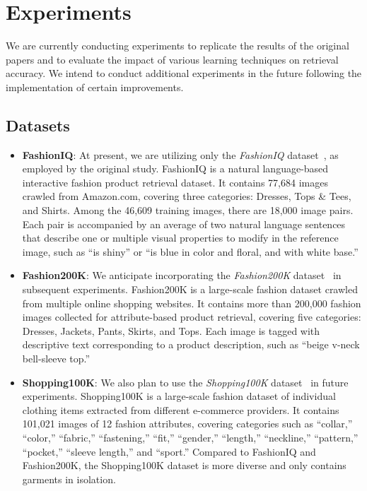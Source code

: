 \FloatBarrier
\section{Experiments}
We are currently conducting experiments to replicate the results of the original papers and to evaluate the impact of various learning techniques on retrieval accuracy. We intend to conduct additional experiments in the future following the implementation of certain improvements.

\subsection{Datasets}
\begin{itemize}
    \item \textbf{FashionIQ}: At present, we are utilizing only the \textit{FashionIQ} dataset~\cite{wu2020fashioniqnewdataset}, as employed by the original study. FashionIQ is a natural language-based interactive fashion product retrieval dataset. It contains 77,684 images crawled from Amazon.com, covering three categories: Dresses, Tops \& Tees, and Shirts. Among the 46,609 training images, there are 18,000 image pairs. Each pair is accompanied by an average of two natural language sentences that describe one or multiple visual properties to modify in the reference image, such as ``is shiny'' or ``is blue in color and floral, and with white base.''
    \item \textbf{Fashion200K}: We anticipate incorporating the \textit{Fashion200K} dataset~\cite{han2017automaticspatiallyawarefashionconcept} in subsequent experiments. Fashion200K is a large-scale fashion dataset crawled from multiple online shopping websites. It contains more than 200,000 fashion images collected for attribute-based product retrieval, covering five categories: Dresses, Jackets, Pants, Skirts, and Tops. Each image is tagged with descriptive text corresponding to a product description, such as ``beige v-neck bell-sleeve top.''
    \item \textbf{Shopping100K}: We also plan to use the \textit{Shopping100K} dataset~\cite{hou2021disentanglement} in future experiments. Shopping100K is a large-scale fashion dataset of individual clothing items extracted from different e-commerce providers. It contains 101,021 images of 12 fashion attributes, covering categories such as ``collar,'' ``color,'' ``fabric,'' ``fastening,'' ``fit,'' ``gender,'' ``length,'' ``neckline,'' ``pattern,'' ``pocket,'' ``sleeve length,'' and ``sport.'' Compared to FashionIQ and Fashion200K, the Shopping100K dataset is more diverse and only contains garments in isolation.
\end{itemize}

